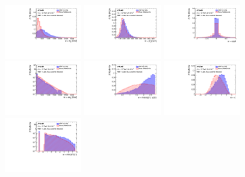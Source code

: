 \begin{figure}[htbp]
  \centering
 \includegraphics[width=0.3\textwidth]{figures/VBF/BDT_input_mJJ4cen.pdf}
 \includegraphics[width=0.3\textwidth]{figures/VBF/BDT_input_pTJJ4cen.pdf}
 \includegraphics[width=0.3\textwidth]{figures/VBF/BDT_input_cosTheta_boost4cen.pdf}\\
 \includegraphics[width=0.3\textwidth]{figures/VBF/BDT_input_deltaMJJ4cen.pdf}
 \includegraphics[width=0.3\textwidth]{figures/VBF/BDT_input_max_J1J24cen.pdf}
 \includegraphics[width=0.3\textwidth]{figures/VBF/BDT_input_eta_J_star4cen.pdf}\\
 \includegraphics[width=0.3\textwidth]{figures/VBF/BDT_input_mindRJ1_Ex4cen.pdf}

\end{figure}

